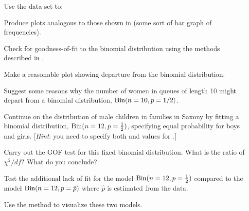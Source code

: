 \documentclass[11pt]{report}\usepackage[]{graphicx}\usepackage[]{color}
\begin{document}
\begin{Exercises}
  \exercise Use the data set  to:
  \begin{enumerate*}
    \item Produce plots analogous to those
  shown in  (some sort of bar graph of frequencies).
    \item Check for goodness-of-fit to the binomial distribution using the
     methods described in .
    \begin{ans}
    \end{ans}
    
    \item Make a reasonable plot showing departure from the binomial distribution.
    \begin{ans}
    \end{ans}
    
    \item Suggest some reasons why the number of women in queues of length 10
    might depart from a binomial distribution, $\Bin(n=10, p=1/2)$.
    \begin{ans}
    \end{ans}
    
  \end{enumerate*}

  \exercise Continue  on the distribution of male children in families
  in Saxony by fitting a binomial distribution, $\Bin(n=12, p=\frac12)$, specifying
  equal probability for boys and girls. [\emph{Hint}:  you need to specify both  and
   values for .]
  \begin{enumerate*}
    \item Carry out the GOF test for this fixed binomial distribution.
    What is the ratio of $\chi^2 / df$? What do you conclude?
    \begin{ans}
    \end{ans}
    
    \item Test the additional lack of fit for the model $\Bin(n=12, p=\frac12)$
    compared to the model $\Bin(n=12, p=\hat{p})$ where $\hat{p}$ is estimated
    from the data.
    \begin{ans}
    \end{ans}
    
    \item Use the  method to visualize these two models.
    \begin{ans}
    \end{ans}
    

\end{enumerate*}
\end{Exercises}
\end{document}
